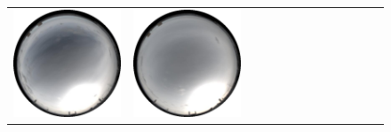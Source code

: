 \documentclass{report}
\begin{document}
\begin{figure}[!th]
\begin{tabular}{@{}rcccccccccccc@{}}
    \includegraphics[width=\customwidth]{./figures/database/20141108_140025.jpg} &
    \includegraphics[width=\customwidth]{./figures/database/20141108_143025.jpg} &

\end{tabular}
\end{figure}
\end{document}
